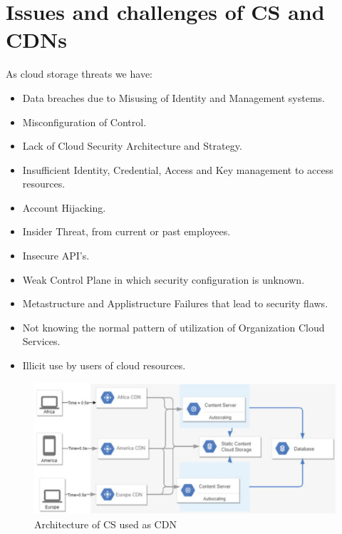 \documentclass[14pt,oneside]{extreport}
\newcommand*\fpar{\hspace{1ex}}
\begin{document}
\section{Issues and challenges of CS and CDNs}
\fpar As cloud storage threats we have: 
\vspace{-1em}
\begin{itemize}[noitemsep]
  \item Data breaches due to Misusing of Identity and Management systems. 
  \item Misconfiguration of Control.
  \item Lack of Cloud Security Architecture and Strategy.
  \item Insufficient Identity, Credential, Access and Key management to access resources.
  \item Account Hijacking. 
  \item Insider Threat, from current or past employees. 
  \item Insecure API's. 
  \item Weak Control Plane in which security configuration is unknown. 
  \item Metastructure and Applistructure Failures that lead to security flaws. 
  \item Not knowing the normal pattern of utilization of Organization Cloud Services. 
  \item Illicit use by users of cloud resources.
\end{itemize}
\begin{figure}[H]
  \centering
  \includegraphics[width=\textwidth]{paper3/threats.png}
  \caption{Architecture of CS used as CDN}
  \label{fig:TODO}
\end{figure}
\end{document}
